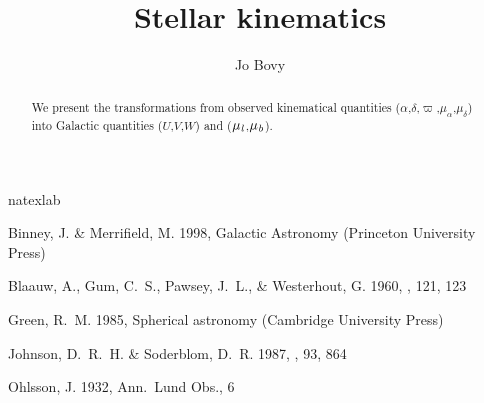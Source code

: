 \documentclass[12pt,preprint]{aastex}
\newcommand{\ra}{\ensuremath{\alpha}}
\newcommand{\dec}{\ensuremath{\delta}}
\newcommand{\pmra}{\ensuremath{\mu_{\ra}}}
\newcommand{\pmdec}{\ensuremath{\mu_{\dec}}}
\newcommand{\gall}{{\it l}}
\newcommand{\galb}{{\it b}}
\newcommand{\pmll}{\ensuremath{\mu_\gall}}
\newcommand{\pmbb}{\ensuremath{\mu_\galb}}
\newcommand{\galU}{\ensuremath{U}}
\newcommand{\galV}{\ensuremath{V}}
\newcommand{\galW}{\ensuremath{W}}
\newcommand{\parallax}{\ensuremath{\varpi}}
\begin{document}
\title{Stellar kinematics}
\author{
  Jo Bovy}

\date{}

\begin{abstract}
We present the transformations from observed kinematical quantities
(\ra,\dec,\parallax,\pmra,\pmdec) into Galactic quantities
(\galU,\galV,\galW) and (\pmll,\pmbb).
\end{abstract}






\begin{thebibliography}{5}
\expandafter\ifx\csname natexlab\endcsname\relax\def\natexlab#1{#1}\fi

{Binney}, J. \& {Merrifield}, M. 1998, {Galactic Astronomy} (Princeton
  University Press)

{Blaauw}, A., {Gum}, C.~S., {Pawsey}, J.~L., \& {Westerhout}, G. 1960, \mnras,
  121, 123

{Green}, R.~M. 1985, {Spherical astronomy} (Cambridge University Press)

{Johnson}, D.~R.~H. \& {Soderblom}, D.~R. 1987, \aj, 93, 864

{Ohlsson}, J. 1932, Ann.~Lund Obs., 6

\end{thebibliography}
\end{document}
